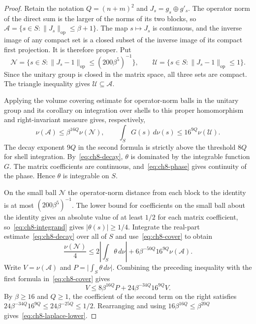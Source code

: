 \begin{proof}
Retain the notation $Q=(n+m)^2$ and $J_s=g_s\oplus g'_s$. The operator norm of the direct sum is the larger of the norms of its two blocks, so $\mathcal A=\{s\in S:\|J_s\|_{\mathrm{op}}\le\beta+1\}$. The map $s\mapsto J_s$ is continuous, and the inverse image of any compact set is a closed subset of the inverse image of its compact first projection. It is therefore proper. Put
\[
 \mathcal N=\bigl\{s\in S:\|J_s-1\|_{\mathrm{op}}\le(200\beta^5)^{-1}\bigr\},
 \qquad
 \mathcal U=\bigl\{s\in S:\|J_s-1\|_{\mathrm{op}}\le1\bigr\}.
\]
Since the unitary group is closed in the matrix space, all three sets are compact. The triangle inequality gives $\mathcal U\subseteq\mathcal A$.

Applying the volume covering estimate for operator-norm balls in the unitary group and its corollary on integration over shells to this proper homomorphism and right-invariant measure gives, respectively,
\begin{equation}
\label{eq:ch8-cover}
 \nu(\mathcal A)\le\beta^{16Q}\nu(\mathcal N),\qquad
 \int_S G(s)\,d\nu(s)\le16^{9Q}\nu(\mathcal U).
\end{equation}
The decay exponent $9Q$ in the second formula is strictly above the threshold $8Q$ for shell integration. By~\eqref{eq:ch8-decay}, $\theta$ is dominated by the integrable function $G$. The matrix coefficients are continuous, and~\eqref{eq:ch8-phase} gives continuity of the phase. Hence $\theta$ is integrable on $S$.

On the small ball $\mathcal N$ the operator-norm distance from each block to the identity is at most $(200\beta^5)^{-1}$. The lower bound for coefficients on the small ball about the identity gives an absolute value of at least $1/2$ for each matrix coefficient, so~\eqref{eq:ch8-integrand} gives $|\theta(s)|\ge1/4$. Integrate the real-part estimate~\eqref{eq:ch8-decay} over all of $S$ and use~\eqref{eq:ch8-cover} to obtain
\[
 \frac{\nu(\mathcal N)}4
 \le 2\left|\int_S\theta\,d\nu\right|
     +6\beta^{-50Q}16^{9Q}\nu(\mathcal A).
\]
Write $V=\nu(\mathcal A)$ and $P=\bigl|\int_S\theta\,d\nu\bigr|$. Combining the preceding inequality with the first formula in~\eqref{eq:ch8-cover} gives
\[
 V\le 8\beta^{16Q}P
    +24\beta^{-34Q}16^{9Q}V.
\]
By $\beta\ge16$ and $Q\ge1$, the coefficient of the second term on the right satisfies $24\beta^{-34Q}16^{9Q}\le 24\beta^{-25Q}\le 1/2$. Rearranging and using $16\beta^{16Q}\le\beta^{20Q}$ gives~\eqref{eq:ch8-laplace-lower}.
\end{proof}

